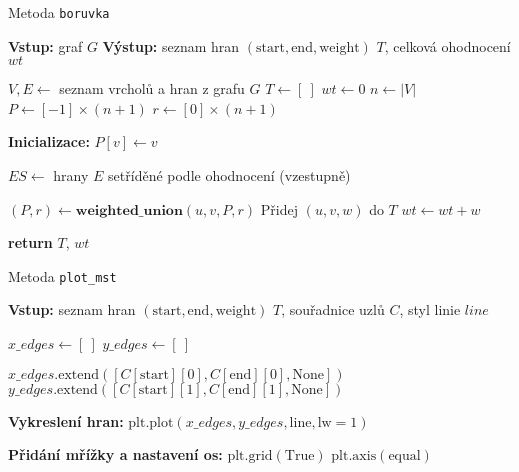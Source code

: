 \begin{algorithm}
    \caption{Metoda \texttt{boruvka}}
    \begin{algorithmic}[1]
        \STATE \textbf{Vstup:} graf $G$
        \STATE \textbf{Výstup:} seznam hran $(\text{start}, \text{end}, \text{weight})$ $T$, celková ohodnocení $wt$

        \STATE $V, E \gets$ seznam vrcholů a hran z grafu $G$
        \STATE $T \gets [~]$
        \STATE $wt \gets 0$
        \STATE $n \gets |V|$ 
        \STATE $P \gets [-1] \times (n+1)$
        \STATE $r \gets [0] \times (n+1)$

        \STATE \textbf{Inicializace:}
            \STATE $P[v] \gets v$
        \ENDFOR

        \STATE $ES \gets$ hrany $E$ setříděné podle ohodnocení (vzestupně)

                \STATE $(P, r) \gets \textbf{weighted\_union}(u, v, P, r)$ 
                \STATE Přidej $(u, v, w)$ do $T$ 
                \STATE $wt \gets wt + w$
            \ENDIF
        \ENDFOR

        \STATE \textbf{return} $T$, $wt$
    \end{algorithmic}
\end{algorithm}

\begin{algorithm}
    \caption{Metoda \texttt{plot\_mst}}
    \begin{algorithmic}[1]
        \STATE \textbf{Vstup:} seznam hran $(\text{start}, \text{end}, \text{weight})$ $T$, souřadnice uzlů $C$, styl linie $line$

        \STATE $x\_edges \gets [~]$
        \STATE $y\_edges \gets [~]$

            \STATE $x\_edges.\text{extend}([C[\text{start}][0], C[\text{end}][0], \text{None}])$ 
            \STATE $y\_edges.\text{extend}([C[\text{start}][1], C[\text{end}][1], \text{None}])$ 
        \ENDFOR

        \STATE \textbf{Vykreslení hran:}
        \STATE $\text{plt.plot}(x\_edges, y\_edges, \text{line}, \text{lw}=1)$

        \STATE \textbf{Přidání mřížky a nastavení os:}
        \STATE $\text{plt.grid}(\text{True})$ 
        \STATE $\text{plt.axis}(\text{equal})$
    \end{algorithmic}
\end{algorithm}

